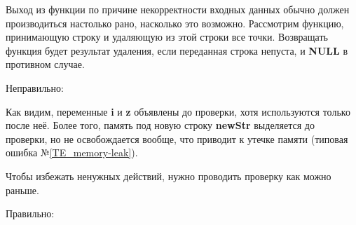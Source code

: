 \begin{typerror}
	\label{TE_too-late-condition}

	Выход из функции по причине некорректности входных данных обычно должен производиться настолько рано,
	насколько это возможно.
	Рассмотрим функцию, принимающую строку и удаляющую из этой строки все точки.
	Возвращать функция будет результат удаления, если переданная строка непуста, и \textbf{NULL} в противном случае.

	Неправильно:

	Как видим, переменные \textbf{i} и \textbf{z} объявлены до проверки, хотя используются только после неё.
	Более того, память под новую строку \textbf{newStr} выделяется до проверки, но не освобождается вообще,
	что приводит к утечке памяти (типовая ошибка №\ref{TE_memory-leak}).

	Чтобы избежать ненужных действий, нужно проводить проверку как можно раньше.

	Правильно:

\end{typerror}
